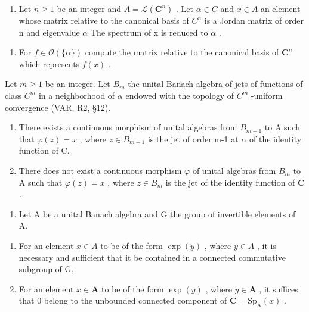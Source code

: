 \begin{enumerate}
\def\labelenumi{\arabic{enumi})}
\tightlist
\item
  Let \(n \geqslant 1\) be an integer and \(A = \mathcal{L}(\mathbf{C}^{n})\) . Let \(\alpha \in C\) and \(x \in A\) an element whose matrix relative to the canonical basis of \(C^{n}\) is a Jordan matrix of order n and eigenvalue \(\alpha\) The spectrum of x is reduced to \(\alpha\) .
\end{enumerate}

\begin{enumerate}
\def\labelenumi{\alph{enumi})}
\tightlist
\item
  For \(f \in \mathcal{O}(\{\alpha\})\) compute the matrix relative to the canonical basis of \(\mathbf{C}^n\) which represents \(f(x)\) .
\end{enumerate}

Let \(m \geqslant 1\) be an integer. Let \(B_{m}\) the unital Banach algebra of jets of functions of class \(C^{m}\) in a neighborhood of \(\alpha\) endowed with the topology of \(C^{m}\) -uniform convergence (VAR, R2, §12).

\begin{enumerate}
\def\labelenumi{\alph{enumi})}
\setcounter{enumi}{1}
\item
  There exists a continuous morphism of unital algebras from \(B_{m-1}\) to A such that \(\varphi(z)=x\) , where \(z\in B_{m-1}\) is the jet of order m-1 at \(\alpha\) of the identity function of C.
\item
  There does not exist a continuous morphism \(\varphi\) of unital algebras from \(B_m\) to A such that \(\varphi(z) = x\) , where \(z \in B_m\) is the jet of the identity function of \(\mathbf{C}\) .
\end{enumerate}

\begin{enumerate}
\def\labelenumi{\arabic{enumi})}
\setcounter{enumi}{1}
\tightlist
\item
  Let A be a unital Banach algebra and G the group of invertible elements of A.
\end{enumerate}

\begin{enumerate}
\def\labelenumi{\alph{enumi})}
\item
  For an element \(x \in A\) to be of the form \(\exp(y)\) , where \(y \in A\) , it is necessary and sufficient that it be contained in a connected commutative subgroup of G.
\item
  For an element \(x \in \mathbf{A}\) to be of the form \(\exp(y)\) , where \(y \in \mathbf{A}\) , it suffices that 0 belong to the unbounded connected component of \(\mathbf{C} = \mathrm{Sp}_{\mathrm{A}}(x)\) .
\end{enumerate}

